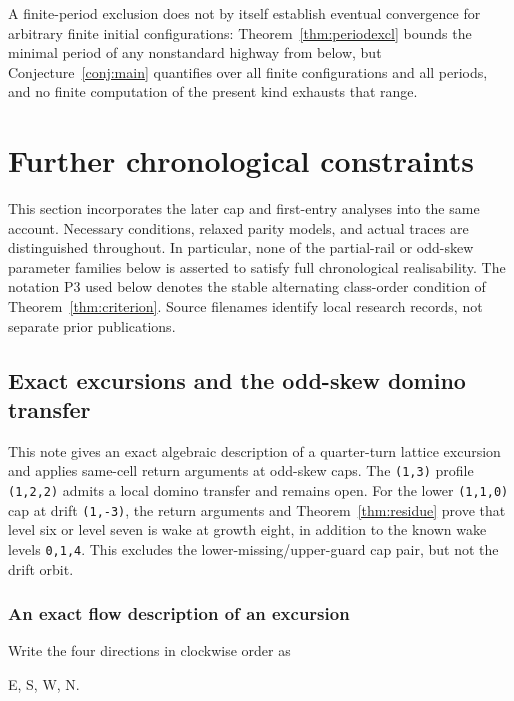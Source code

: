 \documentclass[11pt,letterpaper]{article}
\theoremstyle{plain}
\theoremstyle{definition}
\begin{document}
\begin{NoHyper}
A finite-period exclusion does not by itself establish eventual convergence for
arbitrary finite initial configurations: Theorem~\ref{thm:periodexcl} bounds the
minimal period of any nonstandard highway from below, but Conjecture~\ref{conj:main}
quantifies over all finite configurations and all periods, and no finite computation
of the present kind exhausts that range.

\section{Further chronological constraints}\label{sec:newchronology}
This section incorporates the later cap and first-entry analyses into the same
account. Necessary conditions, relaxed parity models, and actual traces are
distinguished throughout. In particular, none of the partial-rail or
odd-skew parameter families below is asserted to satisfy full chronological
realisability. The notation P3 used below denotes the stable alternating
class-order condition of Theorem~\ref{thm:criterion}. Source filenames identify
local research records, not separate prior publications.

\subsection{Exact excursions and the odd-skew domino transfer}

This note gives an exact algebraic description of a quarter-turn lattice excursion and applies same-cell return arguments at odd-skew caps. The \texttt{(1,3)} profile \texttt{(1,2,2)} admits a local domino transfer and remains open. For the lower \texttt{(1,1,0)} cap at drift \texttt{(1,-3)}, the return arguments and Theorem~\ref{thm:residue} prove that level six or level seven is wake at growth eight, in addition to the known wake levels \texttt{0,1,4}. This excludes the lower-missing/upper-guard cap pair, but not the drift orbit.

\subsubsection{An exact flow description of an excursion}

Write the four directions in clockwise order as

\begin{codeblock}
E, S, W, N.
\end{codeblock}


\end{NoHyper}
\end{document}
